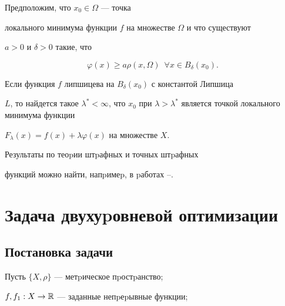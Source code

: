 \begin{thms}\label{T4.6}


Предположим, что $x_0\in \Omega$ --- точка


локального минимума функции $f$ на множестве $\Omega$ и что существуют


$a > 0$ и $\delta > 0$ такие, что


$$




\varphi(x) \geq a\rho(x,\Omega)\ \; \forall x\in


B_{\delta}(x_0).




$$


Если функция $f$ липшицева на $B_{\delta}(x_0)$ с константой Липшица


$L$, то найдется такое $\lambda^{*} < \infty$, что $x_0$ при $\lambda >


\lambda^{*}$ является точкой локального минимума функции


$F_{\lambda}(x) = f(x) + \lambda\varphi(x)$ на множестве $X$.


\end{thms}





Результаты по теоpии штpафных и точных штpафных 


функций можно найти, напpимеp, в pаботах \cite{ddf}--\cite{zang}.








\section{Задача двухуpовневой оптимизации}\label{s2}





\subsection{Постановка задачи}\label{ss2.1}





Пусть $\{X,\rho\}$ --- метpическое пpостpанство;


$f, f_1:X\rightarrow \Bbb R$ --- заданные непpеpывные функции;


